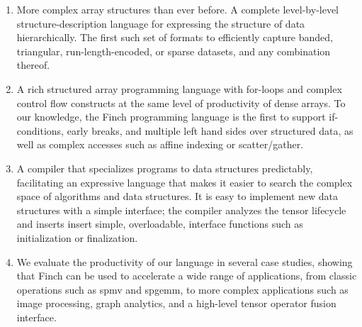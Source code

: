 \begin{enumerate}
\item 
{}

More complex array structures than ever before. A complete level-by-level
structure-description language for expressing the structure of data
hierarchically. The first such set of formats to efficiently capture banded,
triangular, run-length-encoded, or sparse datasets, and any combination thereof.
\item A rich structured array programming language with for-loops
and complex control flow constructs at the same level of productivity
of dense arrays. To our knowledge, the Finch programming language is the first 
to support if-conditions, early breaks, and multiple left hand sides over
structured data, as well as complex accesses such as affine indexing or scatter/gather.  
\item A compiler that specializes programs to data structures 
predictably, facilitating an expressive language that makes it easier to search the complex
space of algorithms and data structures. It is easy to implement new data structures with a simple interface; the compiler analyzes the tensor lifecycle and inserts insert simple, overloadable, interface functions such as
initialization or finalization.
\item We evaluate the productivity of our language in several case studies,
showing that Finch can be used to accelerate a wide range of applications, 
from classic operations such as spmv and spgemm, to more complex applications such as image processing, graph analytics, and a high-level tensor operator fusion interface. 

\end{enumerate}
